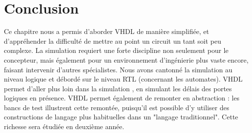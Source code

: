 \section{Conclusion}
Ce chapitre nous a permis d'aborder VHDL de manière simplifiée, et d'appréhender la difficulté de mettre au point un circuit un tant soit peu complexe.
La simulation requiert une forte discipline non seulement pour le concepteur, mais également pour un environnement d'ingénierie plus vaste encore, faisant
intervenir d'autres spécialistes. Nous avons cantonné la simulation au niveau logique et débordé sur le niveau RTL (concernant les automates). VHDL permet
d'aller plus loin dans la simulation , en simulant les délais des portes logiques en présence. VHDL permet également de remonter en abstraction : les bancs de
test illustrent cette remontée, puisqu'il est possible d'y utiliser des constructions de langage plus habituelles dans un "langage traditionnel". Cette richesse
sera étudiée en deuxième année.\\

